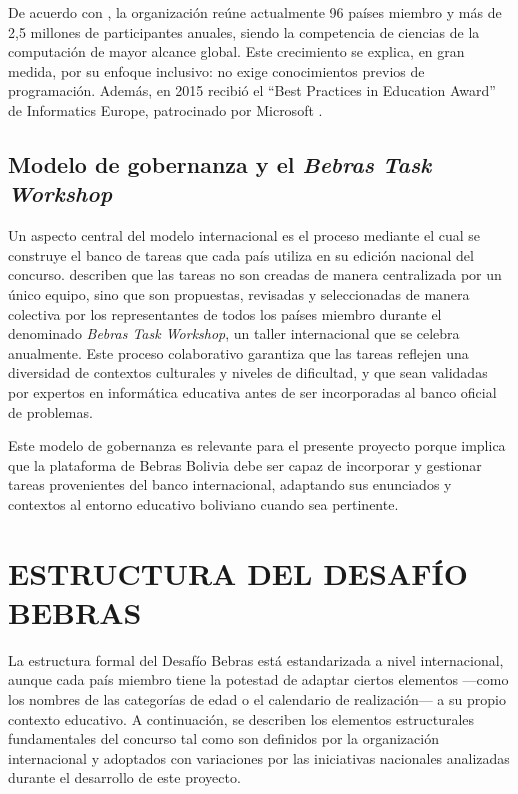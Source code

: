 De acuerdo con \textcite{bebras}, la organización reúne actualmente 96 países miembro y más de 2,5 millones de participantes anuales, siendo la competencia de ciencias de la computación de mayor alcance global. Este crecimiento se explica, en gran medida, por su enfoque inclusivo: no exige conocimientos previos de programación. Además, en 2015 recibió el ``Best Practices in Education Award'' de Informatics Europe, patrocinado por Microsoft \parencite{bebras}.

\subsection{Modelo de gobernanza y el \emph{Bebras Task Workshop}}

Un aspecto central del modelo internacional es el proceso mediante el cual se construye el banco de tareas que cada país utiliza en su edición nacional del concurso. \textcite{dagienefutschek2008} describen que las tareas no son creadas de manera centralizada por un único equipo, sino que son propuestas, revisadas y seleccionadas de manera colectiva por los representantes de todos los países miembro durante el denominado \emph{Bebras Task Workshop}, un taller internacional que se celebra anualmente. Este proceso colaborativo garantiza que las tareas reflejen una diversidad de contextos culturales y niveles de dificultad, y que sean validadas por expertos en informática educativa antes de ser incorporadas al banco oficial de problemas.

Este modelo de gobernanza es relevante para el presente proyecto porque implica que la plataforma de Bebras Bolivia debe ser capaz de incorporar y gestionar tareas provenientes del banco internacional, adaptando sus enunciados y contextos al entorno educativo boliviano cuando sea pertinente.

\section{ESTRUCTURA DEL DESAFÍO BEBRAS}

La estructura formal del Desafío Bebras está estandarizada a nivel internacional, aunque cada país miembro tiene la potestad de adaptar ciertos elementos —como los nombres de las categorías de edad o el calendario de realización— a su propio contexto educativo. A continuación, se describen los elementos estructurales fundamentales del concurso tal como son definidos por la organización internacional y adoptados con variaciones por las iniciativas nacionales analizadas durante el desarrollo de este proyecto.

